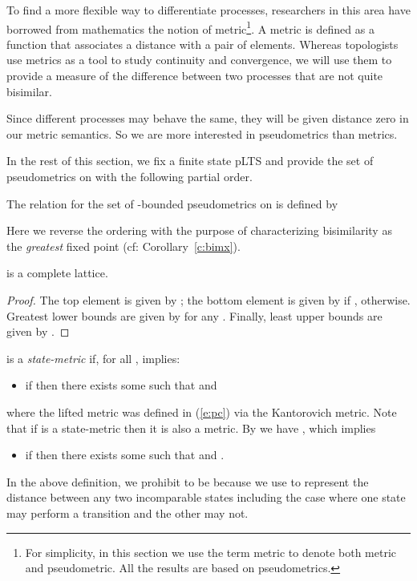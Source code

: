 \documentclass{article}
\begin{document}
To find a more flexible way to differentiate processes, researchers
in this area have borrowed from mathematics the notion of
metric\footnote{For simplicity, in this section we use the term
metric to denote both metric and pseudometric.  All the results are
based on pseudometrics.}.  A metric is defined as a function that
associates a distance with a pair of elements. Whereas topologists
use metrics as a tool to study continuity and convergence, we will
use them to provide a measure of the difference between two
processes that are not quite bisimilar.

 Since different processes may behave  the same, they will be
  given distance zero in our metric semantics. So we are more
  interested in pseudometrics than metrics.

In the rest of this section, we fix a finite state pLTS
 and provide the set of pseudometrics on  with
the following partial order.
\begin{definition}
The relation  for the set  of -bounded
pseudometrics on  is defined by

\end{definition}
Here we reverse the ordering with the purpose of
  characterizing bisimilarity as the {\em greatest} fixed point (cf:
  Corollary~\ref{c:bimx}).

\begin{lemma}\label{l:latt}
 is a complete lattice.
\end{lemma}
\begin{proof}
The top element is given by ; the bottom
element is given by  if ,  otherwise.
Greatest lower bounds are given by  for any . Finally,
least upper bounds are given by .
\end{proof}


\begin{definition}\label{d:sm}
 is a {\em state-metric} if, for all
  ,  implies:
\begin{itemize}
\item if  then there exists some  such that
   and 
\end{itemize}
\end{definition}
where the lifted metric  was defined in (\ref{e:pc}) via
the Kantorovich metric. Note that if  is a state-metric then it
is also a metric. By  we have
, which implies
\begin{itemize}
\item if  then there exists some  such that
   and .
\end{itemize}
In the above definition, we prohibit  to be  because we
use  to represent the distance between any two incomparable
states including the case where one state may perform a transition
and the other may not.
\end{document}
